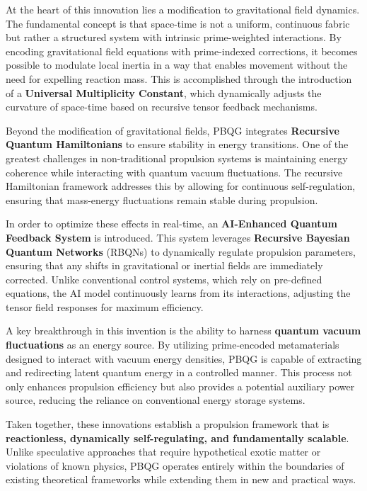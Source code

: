 \documentclass{article}
\theoremstyle{plain}
\begin{document}
At the heart of this innovation lies a modification to gravitational field dynamics. The fundamental concept is that space-time is not a uniform, continuous fabric but rather a structured system with intrinsic prime-weighted interactions. By encoding gravitational field equations with prime-indexed corrections, it becomes possible to modulate local inertia in a way that enables movement without the need for expelling reaction mass. This is accomplished through the introduction of a \textbf{Universal Multiplicity Constant}, which dynamically adjusts the curvature of space-time based on recursive tensor feedback mechanisms.

Beyond the modification of gravitational fields, PBQG integrates \textbf{Recursive Quantum Hamiltonians} to ensure stability in energy transitions. One of the greatest challenges in non-traditional propulsion systems is maintaining energy coherence while interacting with quantum vacuum fluctuations. The recursive Hamiltonian framework addresses this by allowing for continuous self-regulation, ensuring that mass-energy fluctuations remain stable during propulsion.

In order to optimize these effects in real-time, an \textbf{AI-Enhanced Quantum Feedback System} is introduced. This system leverages \textbf{Recursive Bayesian Quantum Networks} (RBQNs) to dynamically regulate propulsion parameters, ensuring that any shifts in gravitational or inertial fields are immediately corrected. Unlike conventional control systems, which rely on pre-defined equations, the AI model continuously learns from its interactions, adjusting the tensor field responses for maximum efficiency.

A key breakthrough in this invention is the ability to harness \textbf{quantum vacuum fluctuations} as an energy source. By utilizing prime-encoded metamaterials designed to interact with vacuum energy densities, PBQG is capable of extracting and redirecting latent quantum energy in a controlled manner. This process not only enhances propulsion efficiency but also provides a potential auxiliary power source, reducing the reliance on conventional energy storage systems.

Taken together, these innovations establish a propulsion framework that is \textbf{reactionless, dynamically self-regulating, and fundamentally scalable}. Unlike speculative approaches that require hypothetical exotic matter or violations of known physics, PBQG operates entirely within the boundaries of existing theoretical frameworks while extending them in new and practical ways. 
\end{document}
